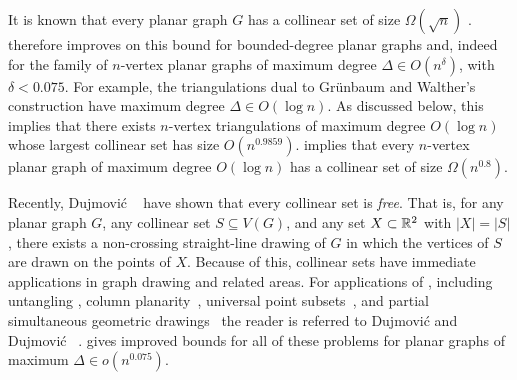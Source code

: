 \documentclass{patmorin}
\begin{document}
It is known that every planar graph $G$ has a collinear set of size
$\Omega(\sqrt{n})$ \cite{bose.dujmovic.ea:polynomial,dujmovic:utility}
.  therefore improves on this bound for bounded-degree planar
graphs and, indeed for the family of $n$-vertex planar graphs of maximum
degree $\Delta\in O(n^{\delta})$, with $\delta < 0.075$.  For example,
the triangulations dual to Gr\"unbaum and Walther's construction have
maximum degree $\Delta \in O(\log n)$.  As discussed below, this implies
that there exists $n$-vertex triangulations of maximum degree $O(\log
n)$ whose largest collinear set has size $O(n^{0.9859})$.  
implies that every $n$-vertex planar graph of maximum degree $O(\log n)$
has a collinear set of size $\Omega(n^{0.8})$.

Recently, Dujmovi\'c \etal\ \cite{dujmovic.frati.ea:every} have shown
that every collinear set is \emph{free}. That is, for any planar graph
$G$, any collinear set $S\subseteq V(G)$, and any set $X\subset\mathbb{R}^2$
with $|X|=|S|$, there exists a non-crossing straight-line drawing of $G$
in which the vertices of $S$ are drawn on the points of $X$.  Because of
this, collinear sets have immediate applications in graph drawing and
related areas.  For applications of , including untangling
\cite{cibulka:untangling,pach.tardos:untangling,watanabe:open,goaoc.kratochvil.ea:untangling,kang.pikhurko.ea:untangling,bose.dujmovic.ea:polynomial,dalozzo.dujmovic.ea:drawing,dujmovic:utility,ravsky.verbitsky:on},
column
planarity~\cite{barba.evans.ea:column,evans.kusters.ea:column,dalozzo.dujmovic.ea:drawing,dujmovic:utility},
universal point
subsets~\cite{digiacomo.liotta.ea:how,angelini.binucci.ea:universal,dalozzo.dujmovic.ea:drawing,dujmovic:utility},
and partial simultaneous geometric
drawings~\cite{evans.kusters.ea:column,barba.hoffmann.ea:column,angelini.evans.ea:sefe,blasius.kobourov.ea:simultaneous,dujmovic:utility}
the reader is referred to Dujmovi\'c \cite{dujmovic:utility}
and Dujmovi\'c \etal\ \cite[Section~1.1]{dujmovic.frati.ea:every}.
 gives improved bounds for all of these problems for planar
graphs of maximum $\Delta\in o(n^{0.075})$.
\end{document}
